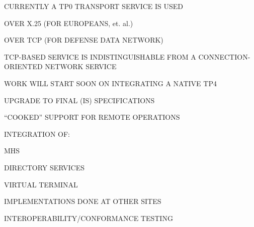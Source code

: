 



\begin{bwslide}

\begin{nrtc}
\item	CURRENTLY A TP0 TRANSPORT SERVICE IS USED
    \begin{nrtc}
    \item	OVER X.25 (FOR EUROPEANS, et. al.)

    \item	OVER TCP (FOR DEFENSE DATA NETWORK)
    \end{nrtc}

\item	TCP-BASED SERVICE IS INDISTINGUISHABLE FROM A CONNECTION-ORIENTED
	NETWORK SERVICE

\item	WORK WILL START SOON ON INTEGRATING A NATIVE TP4
\end{nrtc}
\end{bwslide}


\begin{bwslide}

\begin{nrtc}
\item	UPGRADE TO FINAL (IS) SPECIFICATIONS

\item	``COOKED'' SUPPORT FOR REMOTE OPERATIONS

\item	INTEGRATION OF:
    \begin{nrtc}
    \item	MHS

    \item	DIRECTORY SERVICES

    \item	VIRTUAL TERMINAL
    \end{nrtc}
	IMPLEMENTATIONS DONE AT OTHER SITES

\item	INTEROPERABILITY/CONFORMANCE TESTING
\end{nrtc}
\end{bwslide}


